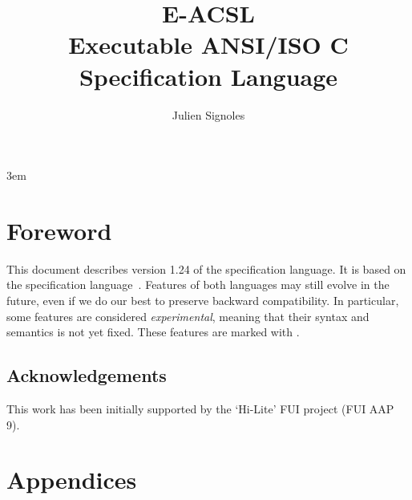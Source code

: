 \documentclass{frama-c-book}
\title{
  \huge %
  E-ACSL \\
  \medskip
  Executable ANSI/ISO C Specification Language
}
\author{Julien Signoles}
\newcommand{\eacsllangversion}{1.24\xspace}
\newcommand{\version}{\eacsllangversion\xspace}
\begin{document}
\sloppy
\emergencystretch 3em

\maketitle

\cleardoublepage
{}
\label{chap:contents}
\tableofcontents

\chapter*{Foreword}

This document describes version \version of the \eacsl specification
language. It is based on the \acsl specification language~\cite{acsl}. Features
of both languages may still evolve in the future, even if we do our best to
preserve backward compatibility. In particular, some features are considered
\emph{experimental}, meaning that their syntax and semantics is not yet fixed.
These features are marked with \experimental.

\section*{Acknowledgements}

\insertpeople

\medskip

This work has been initially supported by the ‘Hi-Lite’ FUI project (FUI AAP 9).










\appendix

\chapter{Appendices}
\label{chap:appendix}



\cleardoublepage
{}



\cleardoublepage
{}
\listoffigures

\cleardoublepage
{}
\printindex
\end{document}
